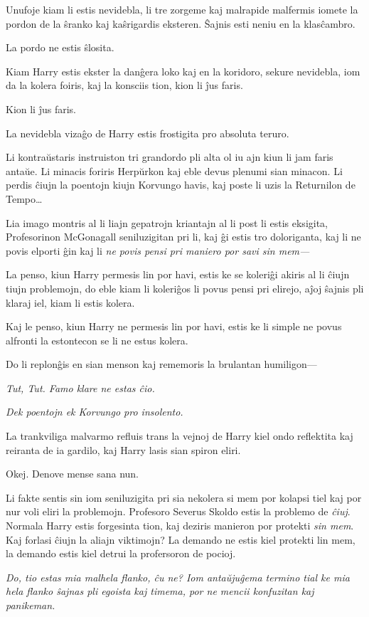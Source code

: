 Unufoje kiam li estis nevidebla, li tre zorgeme kaj malrapide
malfermis iomete la pordon de la ŝranko kaj kaŝrigardis
eksteren. Ŝajnis esti neniu en la klasĉambro.

La pordo ne estis ŝlosita.

Kiam Harry estis ekster la danĝera loko kaj en la koridoro, sekure
nevidebla, iom da la kolera foiris, kaj la konsciis tion, kion li ĵus
faris.

Kion li ĵus faris.

La nevidebla vizaĝo de Harry estis frostigita pro absoluta teruro.

Li kontraŭstaris instruiston tri grandordo pli alta ol iu ajn kiun li
jam faris antaŭe. Li minacis foriris Herpŭrkon kaj eble devus plenumi
sian minacon. Li perdis ĉiujn la poentojn kiujn Korvungo havis, kaj
poste li uzis la Returnilon de Tempo\ldots

Lia imago montris al li liajn gepatrojn kriantajn al li post li estis
eksigita, Profesorinon McGonagall seniluzigitan pri li, kaj ĝi estis tro
doloriganta, kaj li ne povis elporti ĝin kaj li \emph{ne povis pensi
  pri maniero por savi sin mem—}

La penso, kiun Harry permesis lin por havi, estis ke se koleriĝi akiris
al li ĉiujn tiujn problemojn, do eble kiam li koleriĝos li povus pensi
pri elirejo, aĵoj ŝajnis pli klaraj iel, kiam li estis kolera.

Kaj le penso, kiun Harry ne permesis lin por havi, estis ke li simple
ne povus alfronti la estontecon se li ne estus kolera.

Do li replonĝis en sian menson kaj rememoris la brulantan humiligon—

\emph{Tut, Tut. Famo klare ne estas ĉio.}

\emph{Dek poentojn ek Korvungo pro insolento.}

La trankviliga malvarmo refluis trans la vejnoj de Harry kiel ondo
reflektita kaj reiranta de ia gardilo, kaj Harry lasis sian spiron
eliri.

Okej. Denove mense sana nun.

Li fakte sentis sin iom seniluzigita pri sia nekolera si mem por
kolapsi tiel kaj por nur voli eliri la problemojn. Profesoro Severus
Skoldo estis la problemo de \emph{ĉiuj}. Normala Harry estis
forgesinta tion, kaj deziris manieron por protekti \emph{sin mem}. Kaj
forlasi ĉiujn la aliajn viktimojn? La demando ne estis kiel protekti
lin mem, la demando estis kiel detrui la profersoron de pocioj.

\emph{Do, tio estas mia malhela flanko, ĉu ne? Iom antaŭjuĝema termino
tial ke mia hela flanko ŝajnas pli egoista kaj timema, por ne mencii
konfuzitan kaj panikeman.}

